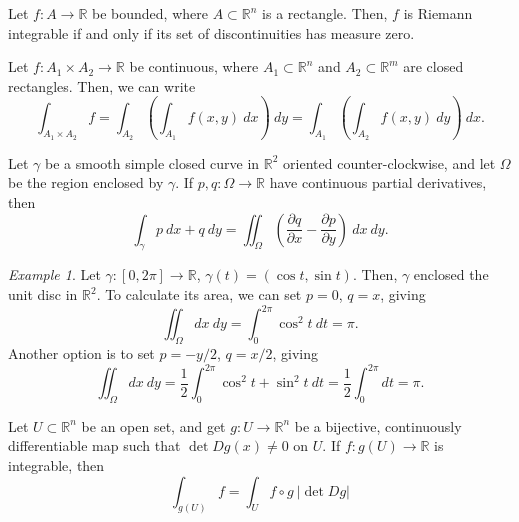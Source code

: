 \documentclass[11pt]{article}
\newcommand{\R}{\mathbb{R}}
\newcommand{\pp}[2]{\frac{\partial #1}{\partial #2}}
\theoremstyle{definition}
\theoremstyle{remark}
\newtheorem*{example}{Example}
\numberwithin{equation}{section}
\begin{document}
    \begin{theorem}
        Let $f\colon A \to \R$ be bounded, where $A \subset \R^n$ is a rectangle.
        Then, $f$ is Riemann integrable if and only if its set of discontinuities has
        measure zero.
    \end{theorem}


    \begin{theorem}
        Let $f\colon A_1 \times A_2 \to \R$ be continuous, where $A_1 \subset \R^n$
        and $A_2 \subset \R^m$ are closed rectangles. Then, we can write \[
            \int_{A_1 \times A_2} f = \int_{A_2} \left( \int_{A_1} f(x,
            y)\:dx\right)\:dy = \int_{A_1} \left( \int_{A_2} f(x, y)\:dy\right)\:dx.
        \] 
    \end{theorem}
    
    \begin{theorem}
        Let $\gamma$ be a smooth simple closed curve in $\R^2$ oriented
        counter-clockwise, and let $\Omega$ be the region enclosed by $\gamma$. If
        $p, q \colon \Omega \to \R$ have continuous partial derivatives, then \[
            \int_\gamma p\:dx + q\:dy = \iint_\Omega \left(\pp{q}{x} -
            \pp{p}{y}\right) \:dx\:dy.
        \] 
    \end{theorem}
    \begin{example}
        Let $\gamma \colon [0, 2\pi] \to \R$, $\gamma(t) = (\cos{t}, \sin{t})$. Then,
        $\gamma$ enclosed the unit disc in $\R^2$. To calculate its area, we can set
        $p = 0$, $q = x$, giving \[
            \iint_{\Omega} dx\:dy = \int_0^{2\pi} \cos^2{t}\:dt = \pi.
        \] Another option is to set $p = -y / 2$, $q = x / 2$, giving \[
            \iint_{\Omega} dx\:dy = \frac{1}{2}\int_0^{2\pi} \cos^2{t}+
            \sin^2{t}\:dt = \frac{1}{2}\int_0^{2\pi} dt = \pi.
        \] 
    \end{example}


    \begin{theorem}
        Let $U \subset \R^n$ be an open set, and get $g\colon U \to \R^n$ be a
        bijective, continuously differentiable map such that $\det{Dg(x)} \neq 0$ on
        $U$. If $f\colon g(U) \to \R$ is integrable, then \[
            \int_{g(U)} f = \int_U f\circ g\:|\det{Dg}|
        \] 
    \end{theorem}
\end{document}
